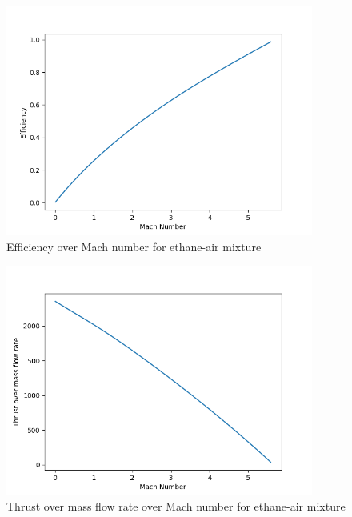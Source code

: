 \documentclass[a4paper,11pt]{article}
\begin{document}
	\begin{figure}[H]
		\centering
		\includegraphics[width=0.9\textwidth]{etan_pow(1mol)/Efficiency_over_Mach.png}
       		\caption{Efficiency over Mach number for ethane-air mixture}
	\end{figure}
	\begin{figure}[H]
		\centering
		\includegraphics[width=0.9\textwidth]{etan_pow(1mol)/Thrust_over_mass_flow_rate_over_Mach.png}
       		\caption{Thrust over mass flow rate over Mach number for ethane-air mixture}
	\end{figure}
\end{document}
